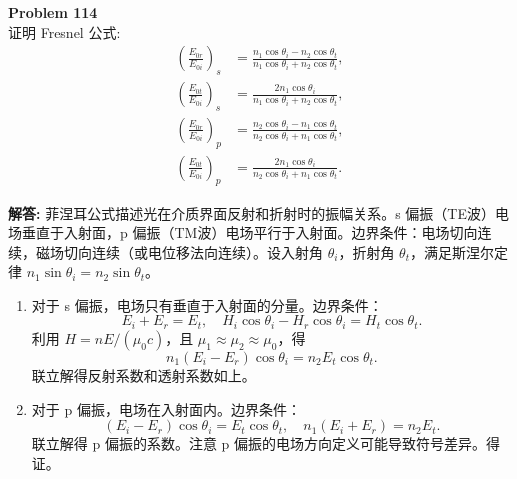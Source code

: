 \documentclass[12pt, a4paper, oneside]{ctexart}
\newenvironment{solution}{\par\noindent\textbf{解答:}\quad}{\par}
\begin{document}
\begin{mdframed}[backgroundcolor=gray!10, linewidth=0pt]
    \textbf{Problem 114} \\
    证明 Fresnel 公式:
    \[
    \begin{aligned}
        \left(\frac{E_{0r}}{E_{0i}}\right)_s &= \frac{n_1 \cos\theta_i - n_2 \cos\theta_t}{n_1 \cos\theta_i + n_2 \cos\theta_t}, \\
        \left(\frac{E_{0t}}{E_{0i}}\right)_s &= \frac{2 n_1 \cos\theta_i}{n_1 \cos\theta_i + n_2 \cos\theta_t}, \\
        \left(\frac{E_{0r}}{E_{0i}}\right)_p &= \frac{n_2 \cos\theta_i - n_1 \cos\theta_t}{n_2 \cos\theta_i + n_1 \cos\theta_t}, \\
        \left(\frac{E_{0t}}{E_{0i}}\right)_p &= \frac{2 n_1 \cos\theta_i}{n_2 \cos\theta_i + n_1 \cos\theta_t}.
    \end{aligned}
    \]
\end{mdframed}
\begin{solution}
    菲涅耳公式描述光在介质界面反射和折射时的振幅关系。s 偏振（TE波）电场垂直于入射面，p 偏振（TM波）电场平行于入射面。边界条件：电场切向连续，磁场切向连续（或电位移法向连续）。设入射角 $\theta_i$，折射角 $\theta_t$，满足斯涅尔定律 $n_1 \sin\theta_i = n_2 \sin\theta_t$。
    \begin{enumerate}
        \item 对于 s 偏振，电场只有垂直于入射面的分量。边界条件：
        \[
        E_{i} + E_{r} = E_{t}, \quad H_{i} \cos\theta_i - H_{r} \cos\theta_i = H_{t} \cos\theta_t.
        \]
        利用 $H = n E / (\mu_0 c)$，且 $\mu_1 \approx \mu_2 \approx \mu_0$，得
        \[
        n_1 (E_i - E_r) \cos\theta_i = n_2 E_t \cos\theta_t.
        \]
        联立解得反射系数和透射系数如上。
        \item 对于 p 偏振，电场在入射面内。边界条件：
        \[
        (E_i - E_r) \cos\theta_i = E_t \cos\theta_t, \quad n_1 (E_i + E_r) = n_2 E_t.
        \]
        联立解得 p 偏振的系数。注意 p 偏振的电场方向定义可能导致符号差异。得证。
    \end{enumerate}
\end{solution}
\end{document}
